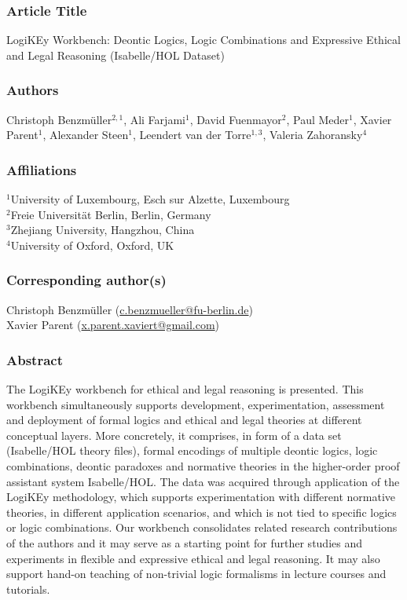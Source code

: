 \documentclass{article}
\newcommand{\comment}[1]{
}
\begin{document}
\subsubsection*{Article Title}
LogiKEy Workbench: Deontic Logics, Logic Combinations and Expressive
Ethical and Legal Reasoning (Isabelle/HOL Dataset)

\subsubsection*{Authors}
Christoph Benzm\"uller$^{2,1}$, Ali Farjami$^{1}$, David
Fuenmayor$^{2}$, Paul Meder$^{1}$, Xavier Parent$^{1}$, Alexander
Steen$^{1}$, Leendert van der Torre$^{1,3}$, Valeria Zahoransky$^{4}$

\subsubsection*{Affiliations}
$^{1}$University of Luxembourg, Esch sur Alzette, Luxembourg\\
$^{2}$Freie Universit\"at Berlin, Berlin, Germany \\
$^{3}$Zhejiang University, Hangzhou, China \\
$^{4}$University of Oxford, Oxford, UK\\

\subsubsection*{Corresponding author(s)}
Christoph Benzm\"uller (\url{c.benzmueller@fu-berlin.de}) \\
Xavier Parent (\url{x.parent.xaviert@gmail.com}) 

\comment{
[Firstname Lastname (email@address) – institutional email address preferred]
}


\subsubsection*{Abstract}
The LogiKEy workbench for 
ethical and legal reasoning is presented. This workbench
simultaneously supports development, experimentation, assessment and
deployment of formal logics and ethical and legal theories at
different conceptual layers. 
More concretely, it comprises, in form of a data set (Isabelle/HOL theory
files), formal encodings of multiple deontic logics, logic
combinations, deontic paradoxes and normative theories in the
higher-order proof assistant system Isabelle/HOL.  The data was
acquired through application of the LogiKEy methodology, which
supports experimentation with different normative theories, in
different application scenarios, and which is not tied to specific
logics or logic combinations.  Our workbench consolidates
related research contributions of the authors and it may serve as a
starting point for further studies and experiments in flexible and
expressive ethical and legal reasoning. It may also support hand-on
teaching of non-trivial logic formalisms in lecture courses and
tutorials.
\end{document}
